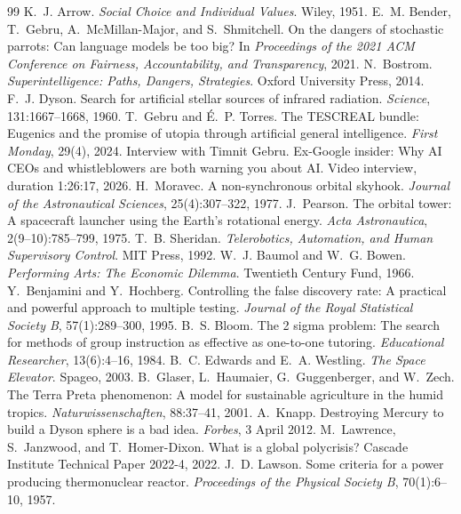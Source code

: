 \begin{thebibliography}{99}
 K.~J. Arrow. \emph{Social Choice and Individual Values}. Wiley, 1951.
 E.~M. Bender, T.~Gebru, A.~McMillan-Major, and S.~Shmitchell. On the dangers of stochastic parrots: Can language models be too big? In \emph{Proceedings of the 2021 ACM Conference on Fairness, Accountability, and Transparency}, 2021.
 N.~Bostrom. \emph{Superintelligence: Paths, Dangers, Strategies}. Oxford University Press, 2014.
 F.~J. Dyson. Search for artificial stellar sources of infrared radiation. \emph{Science}, 131:1667--1668, 1960.
 T.~Gebru and \'E.~P. Torres. The TESCREAL bundle: Eugenics and the promise of utopia through artificial general intelligence. \emph{First Monday}, 29(4), 2024.
 Interview with Timnit Gebru. Ex-Google insider: Why AI CEOs and whistleblowers are both warning you about AI. Video interview, duration 1:26:17, 2026.
 H.~Moravec. A non-synchronous orbital skyhook. \emph{Journal of the Astronautical Sciences}, 25(4):307--322, 1977.
 J.~Pearson. The orbital tower: A spacecraft launcher using the Earth's rotational energy. \emph{Acta Astronautica}, 2(9--10):785--799, 1975.
 T.~B. Sheridan. \emph{Telerobotics, Automation, and Human Supervisory Control}. MIT Press, 1992.
 W.~J. Baumol and W.~G. Bowen. \emph{Performing Arts: The Economic Dilemma}. Twentieth Century Fund, 1966.
 Y.~Benjamini and Y.~Hochberg. Controlling the false discovery rate: A practical and powerful approach to multiple testing. \emph{Journal of the Royal Statistical Society B}, 57(1):289--300, 1995.
 B.~S. Bloom. The 2 sigma problem: The search for methods of group instruction as effective as one-to-one tutoring. \emph{Educational Researcher}, 13(6):4--16, 1984.
 B.~C. Edwards and E.~A. Westling. \emph{The Space Elevator}. Spageo, 2003.
 B.~Glaser, L.~Haumaier, G.~Guggenberger, and W.~Zech. The Terra Preta phenomenon: A model for sustainable agriculture in the humid tropics. \emph{Naturwissenschaften}, 88:37--41, 2001.
 A.~Knapp. Destroying Mercury to build a Dyson sphere is a bad idea. \emph{Forbes}, 3 April 2012.
 M.~Lawrence, S.~Janzwood, and T.~Homer-Dixon. What is a global polycrisis? Cascade Institute Technical Paper 2022-4, 2022.
 J.~D. Lawson. Some criteria for a power producing thermonuclear reactor. \emph{Proceedings of the Physical Society B}, 70(1):6--10, 1957.

\end{thebibliography}
